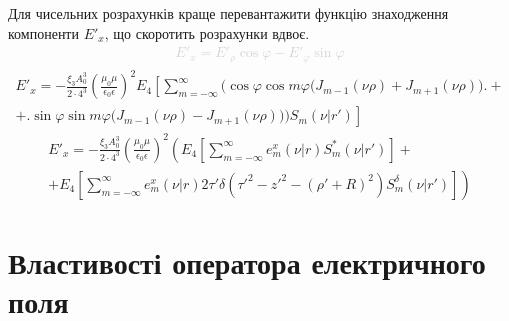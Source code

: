 %
Для чисельних розрахунків краще перевантажити функцію знаходження компоненти 
$ E'_x $, що скоротить розрахунки вдвоє.
%
\textcolor{lightgray} { \begin{equation*} \begin{aligned}
E'_x = E'_\rho \cos \varphi - E'_\varphi \sin \varphi
\end{aligned} \end{equation*} }
%
\begin{equation*} \begin{aligned}
E'_x = - \frac{\xi_3 A_0^3}{2 \cdot 4^3}
\left( \frac{\mu_0 \mu} {\epsilon_0 \epsilon} \right)^2
E_4 \left[ \sum_{m=-\infty}^\infty
\Big( \cos \varphi \cos m \varphi 
\big( J_{m-1}(\nu \rho) + J_{m+1}(\nu \rho) \big) \Big. \right. + \\
+ \left. \Big. \sin \varphi \sin m \varphi 
\big( J_{m-1}(\nu \rho) - J_{m+1}(\nu \rho) \big) \Big) 
S_m (\nu | r') \right]
\end{aligned} \end{equation*}
%
\begin{equation*} \begin{aligned}
E'_x = - \frac{\xi_3 A_0^3}{2 \cdot 4^3} \left(
\frac{\mu_0 \mu} {\epsilon_0 \epsilon} \right)^2
\left( E_4 \left[ \sum_{m=-\infty}^\infty 
e_m^x (\nu | r) S_m^* (\nu | r') \right] \right. + \\
+ \left. E_4 \left[ \sum_{m=-\infty}^\infty 
e_m^x (\nu | r) 2 \tau' \delta \left( {\tau'}^2 - {z'}^2 - (\rho'+R)^2 \right) 
S_m^\delta (\nu | r') \right] \right)
\end{aligned} \end{equation*}

\section{Властивості оператора електричного поля}

